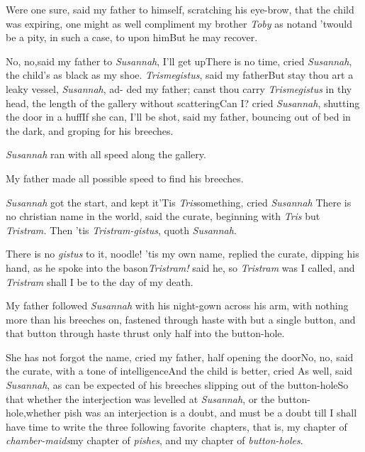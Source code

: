 \documentclass[twoside]{article}
\begin{document}
Were one sure, said my father to himself, scratching his
eye-brow, that the child was expiring, one might as well compliment
my brother \textit{Toby} as not\tsk\break and ’twould be a pity, in
such a case, to\break{} upon him\tsk But he may
recover.

No, no,\tsk said my father to \textit{Susannah},\break
I’ll get up\tsk There is no time, cried\break
\textit{Susannah}, the child’s as black as my shoe.\break
\textit{Trismegistus}, said my father\tsk But stay\break
\tsh thou art a leaky vessel, \textit{Susannah}, ad-\break
ded my father; canst thou carry \textit{Trisme\-gistus} in thy head, the
length of the gal\-lery without scattering\tsk Can I? cried\break
\textit{Susannah}, shutting the door in a huff\tsk\break If she
can, I’ll be shot, said my father, bouncing out of bed in the
dark, and groping for his breeches.

\textit{Susannah} ran with all speed along the gallery.

My father made all possible speed to find his breeches.

\textit{Susannah} got the start, and kept it\tsk ’Tis
\textit{Tris}\tsk something, cried \textit{Susannah}\tsk{}
There is no christian name in the world, said the curate, beginning with
\textit{Tris}\tsk\break
but \textit{Tristram.} Then ’tis
\textit{Tristram-gistus}, quoth \textit{Susannah}.

\tsk There is no \textit{gistus} to it, noodle!\tsk\break
’tis my own name, replied the curate,
dipping his hand, as he spoke into the\break
bason\tsk \textit{Tristram!} said he, \etc \etc \etc
\etc so \textit{Tristram} was I called, and \textit{Tristram}
shall I be to the day of my death.

My father followed \textit{Susannah} with his\break
night-gown across his arm, with nothing\break
more than his breeches on, fastened\break
through haste with but a single button,\break
and that button through haste thrust\break
only half into the button-hole.

\tsh She has not forgot the name, cried my father, half
opening the door\tsk No,
no, said the curate, with a tone of intelligence\tsk And
the child is better, cried  As well, said \textit{Susannah}, as
can be ex\-pect\-ed\tsk {} 
of his breeches slipping out of the button-hole\tsk So that whether
the interjection was levelled at \textit{Susannah}, or the
button-hole,\tsk whether pish was an interjection  is a doubt, and must be a
doubt till I shall have time to write the three following
favorite\sic\ chapters, that is, my chapter of
\textit{chamber-maids}\tsk my chapter of \textit{pishes},
and my chapter of \textit{button-holes}.
\end{document}
